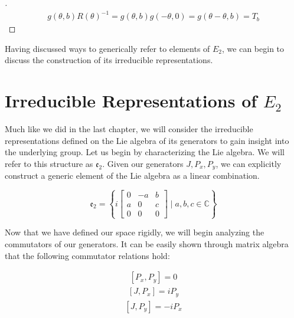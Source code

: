 \documentclass[10pt]{ucthesis}
\newcommand{\C}{\mathbb{C}}
\begin{document}
\noindent\begin{proof}[\cite{Tung}]
\begin{equation}
\begin{aligned}
g(\theta,b)R(\theta)^{-1} = g(\theta,b)g(-\theta,0) = g(\theta-\theta,b) = T_b 
\end{aligned}
\end{equation}
\end{proof}

Having discussed ways to generically refer to elements of $E_2$, we can begin to discuss the construction of its irreducible representations.

\section{Irreducible Representations of $E_2$}

Much like we did in the last chapter, we will consider the irreducible representations defined on the Lie algebra of its generators to gain insight into the underlying group. Let us begin by characterizing the Lie algebra. We will refer to this structure as $\mathfrak{e_2}$. Given our generators $J, P_x,P_y$, we can explicitly construct a generic element of the Lie algebra as a linear combination.

$$\mathfrak{e_2} = \left\{i\begin{bmatrix}
								0 & -a & b \\
								a & 0 & c \\
								0 & 0 & 0
							 \end{bmatrix} \mid a,b,c \in \C\right\}$$

Now that we have defined our space rigidly, we will begin analyzing the commutators of our generators. It can be easily shown through matrix algebra that the following commutator relations hold:

\begin{equation}
\begin{aligned}
	[P_x,P_y] = 0
\end{aligned}
\end{equation}
\begin{equation}
\begin{aligned}
	[J,P_x] = iP_y
\end{aligned}
\end{equation}
\begin{equation}
\begin{aligned}
	[J,P_y] = -iP_x
\end{aligned}
\end{equation}
\end{document}
